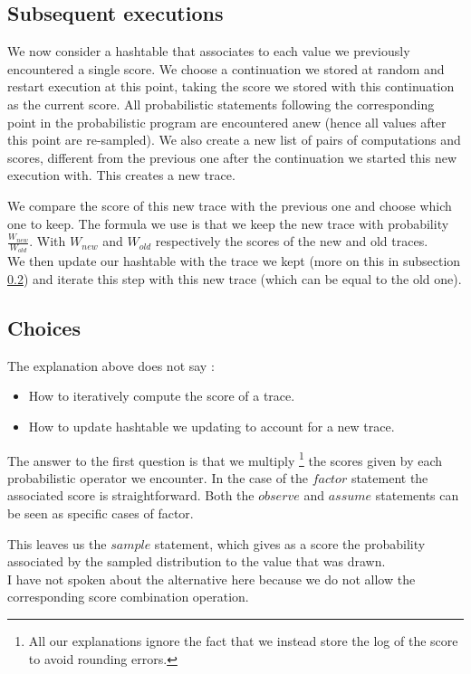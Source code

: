 \documentclass{article}
\newcommand\SC[1]{{\color{violet}{\it \bf Simon :} #1}}
\begin{document}
	\subsection{Subsequent executions}

	We now consider a hashtable that associates to each value we previously encountered a single score. 
	We choose a continuation we stored at random and restart execution at this point, taking the score we stored with this continuation as the current score. 
	All probabilistic statements following the corresponding point in the probabilistic program are encountered anew (hence all values after this point are re-sampled).
	We also create a new list of pairs of computations and scores, different from the previous one after the continuation we started this new execution with.
	This creates a new trace.

	We compare the score of this new trace with the previous one and choose which one to keep.
	The formula we use is that we keep the new trace with probability $\frac{W_{new}}{W_{old}}$. 
	With $W_{new}$ and $W_{old}$ respectively the scores of the new and old traces. \\

	We then update our hashtable with the trace we kept (more on this in subsection \ref{subseq:choice}) and iterate this step with this new trace (which can be equal to the old one).

	\subsection{Choices}
	\label{subseq:choice}

	The explanation above does not say :
	\begin{itemize}
	  \item How to iteratively compute the score of a trace.
	  \item How to update hashtable we updating to account for a new trace.
	\end{itemize}

	The answer to the first question is that we multiply 
	\footnote{All our explanations ignore the fact that we instead store the log of the score to avoid rounding errors.}
	the scores given by each probabilistic operator we encounter.
	In the case of the $factor$ statement the associated score is straightforward. 
	Both the $observe$ and $assume$ statements can be seen as specific cases of factor.

	This leaves us the $sample$ statement, which gives as a score the probability associated by the sampled distribution to the value that was drawn. \\
	\SC{I have not spoken about the alternative here because we do not allow the corresponding score combination operation.}
\end{document}
